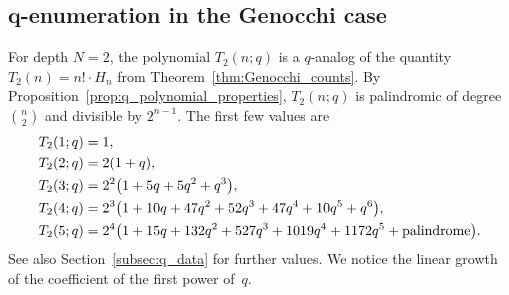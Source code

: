 \documentclass[pdftex]{sigma}
\numberwithin{equation}{section}
\theoremstyle{definition}
\begin{document}
\subsection[q-enumeration in the Genocchi case]{$\boldsymbol{q}$-enumeration in the Genocchi case}
\label{subsec:q_genocchi_case}

For depth $N=2$, the polynomial $T_2(n;q)$ is a $q$-analog of the quantity
$T_2(n) = n! \cdot H_n$ from Theorem~\ref{thm:Genocchi_counts}.
By Proposition~\ref{prop:q_polynomial_properties}, $T_2(n;q)$ is palindromic of degree
$\binom{n}{2}$ and divisible by $2^{n-1}$.
The first few values are
\begin{align*}
	&T_2(1;q)= 1, \\
	&T_2(2;q)= 2(1+q), \\
	&T_2(3;q)= 2^2\bigl(1+5q+5q^2+q^3\bigr), \\
	&T_2(4;q)= 2^3\bigl(1+10q+47q^2+52q^3+47q^4+10q^5+q^6\bigr), \\
	 &T_2(5;q)=
	2^4\bigl(1+15q+132q^2+527q^3+1019q^4+1172q^5+\textnormal{palindrome}\bigr).
\end{align*}
See also Section~\ref{subsec:q_data} for further values.
We notice the linear growth of the coefficient of the first power of~$q$.
\end{document}
